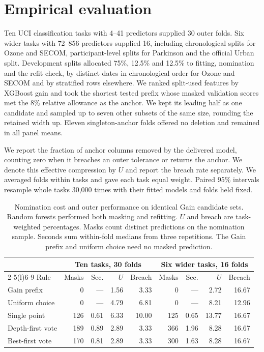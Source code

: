 \section{Empirical evaluation}
\label{sec:minimum-results}
Ten UCI classification tasks with 4--41 predictors supplied 30 outer folds.
Six wider tasks with 72--856 predictors supplied 16, including chronological
splits for Ozone and SECOM, participant-level splits for Parkinson and the
official Urban split. Development splits allocated 75\%, 12.5\% and 12.5\%
to fitting, nomination and the refit check, by distinct dates in chronological
order for Ozone and SECOM and by stratified rows elsewhere. We ranked split-used features by XGBoost gain
and took the shortest tested prefix whose masked validation scores met the
8\% relative allowance as the anchor. We kept its leading half as one
candidate and sampled up to seven other subsets of the same size, rounding
the retained width up. Eleven singleton-anchor folds offered no deletion and remained in all panel means.

We report the fraction of anchor columns removed by the delivered model,
counting zero when it breaches an outer tolerance or returns the anchor.
We denote this effective compression by \(U\) and report the breach rate
separately. We averaged folds within tasks and gave each task equal weight.
Paired 95\% intervals resample whole tasks 30,000 times with their fitted
models and folds held fixed.

\begin{table}[tb]
\centering\small
\caption{Nomination cost and outer performance on identical Gain candidate
sets. Random forests performed both masking and refitting. \(U\) and breach
are task-weighted percentages. Masks count distinct predictions on the
nomination sample. Seconds sum within-fold medians from three repetitions.
The Gain prefix and uniform choice need no masked prediction.}
\label{tab:minimum-cost-outcome}
\setlength{\tabcolsep}{4pt}
\begin{tabular}{@{}lrrrrrrrr@{}}
\toprule
&\multicolumn{4}{c}{Ten tasks, 30 folds}&\multicolumn{4}{c}{Six wider tasks, 16 folds}\\
\cmidrule(lr){2-5}\cmidrule(l){6-9}
Rule & Masks & Sec. & \(U\) & Breach & Masks & Sec. & \(U\) & Breach\\
\midrule
Gain prefix     &0   &--- &1.56&3.33 &0     &--- &2.72 &16.67\\
Uniform choice  &0   &--- &4.79&6.81 &0     &--- &8.21 &12.96\\
Single point     &126 &0.61&6.33&10.00&125 &0.65&13.77&16.67\\
Depth-first vote &189 &0.89&2.89&3.33 &366 &1.96&8.28 &16.67\\
Best-first vote  &170 &0.81&2.89&3.33 &300 &1.63&8.28 &16.67\\
\bottomrule
\end{tabular}
\end{table}

